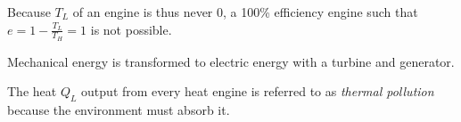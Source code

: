 \begin{note}
    Because $T_L$ of an engine is thus never 0, a 100\% efficiency engine such that $e = 1 - \frac{T_L}{T_H} = 1$ is not possible.
\end{note}
\begin{note}
    Mechanical energy is transformed to electric energy with a turbine and generator.
\end{note}
\begin{definition}
    The heat $Q_L$ output from every heat engine is referred to as \emph{thermal pollution} because the environment must absorb it.
\end{definition}